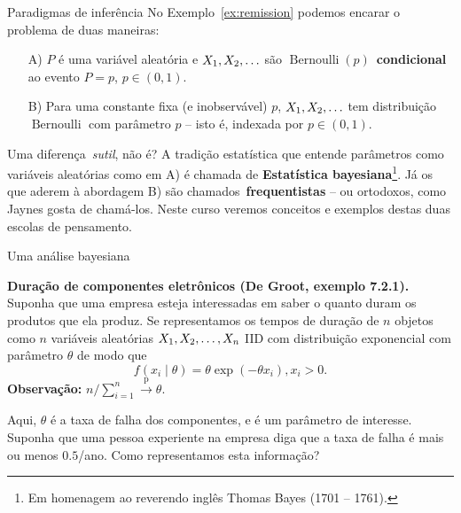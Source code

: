 \begin{frame}{Paradigmas de inferência}
No Exemplo~\ref{ex:remission} podemos encarar o problema de duas maneiras:
\begin{itemize}
 \item[A)] $P$ é uma variável aleatória e $X_1, X_2, \ldots$ são $\operatorname{Bernoulli}(p)$~\textbf{condicional} ao evento $P = p$, $p \in (0, 1)$.
 \item[B)] Para uma constante fixa (e inobservável) $p$, $X_1, X_2, \ldots$ tem distribuição $\operatorname{Bernoulli}$ com parâmetro $p$ -- isto é, indexada por $p \in (0, 1)$.
\end{itemize}
Uma diferença~\textit{sutil}, não é?
A tradição estatística que entende parâmetros como variáveis aleatórias como em A) é chamada de \textbf{Estatística bayesiana}\footnote{Em homenagem ao reverendo inglês Thomas Bayes (1701 -- 1761).}.
Já os que aderem à abordagem B) são chamados~\textbf{frequentistas} -- ou ortodoxos, como Jaynes gosta de chamá-los.
Neste curso veremos conceitos e exemplos destas duas escolas de pensamento. 
\end{frame}
\begin{frame}{Uma análise bayesiana}
\begin{exemplo}
\label{ex:duracao_componentes}
\textbf{Duração de componentes eletrônicos (De Groot, exemplo 7.2.1).}
Suponha que uma empresa esteja interessadas em saber o quanto duram os produtos que ela produz.
Se representamos os tempos de duração de $n$ objetos como $n$ variáveis aleatórias $X_1, X_2, \ldots, X_n$ IID com distribuição exponencial com parâmetro $\theta$ de modo que
$$f(x_i \mid \theta) = \theta \exp(-\theta x_i), x_i > 0.$$
\textbf{Observação:} $n/\sum_{i=1}^n \xrightarrow{\text{p}} \theta$.

Aqui, $\theta$ é a taxa de falha dos componentes, e é um parâmetro de interesse.
Suponha que uma pessoa experiente na empresa diga que a taxa de falha é mais ou menos $0.5$/ano.
Como representamos esta informação?
\end{exemplo} 
\end{frame}
